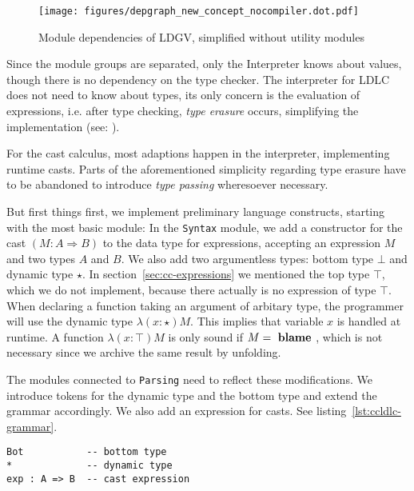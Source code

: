 \begin{figure}
 \centering
 \texttt{[image: figures/depgraph\_new\_concept\_nocompiler.dot.pdf]}
 \caption[Module dependencies of LDGV]{Module dependencies of LDGV, simplified without utility modules}
 \label{fig:dependency-graph}
\end{figure}

Since the module groups are separated, only the Interpreter knows about values, though there is no dependency on the type checker. The interpreter for LDLC does not need to know about types, its only concern is the evaluation of expressions, i.e. after type checking, \emph{type erasure} occurs, simplifying the implementation (see: \cite{crary2002}).

For the cast calculus, most adaptions happen in the interpreter, implementing runtime casts. Parts of the aforementioned simplicity regarding type erasure have to be abandoned to introduce \emph{type passing} wheresoever necessary.

But first things first, we implement preliminary language constructs, starting with the most basic module: In the \texttt{Syntax} module, we add a constructor for the cast $(M : A \Rightarrow B)$ to the data type for expressions, accepting an expression $M$ and two types $A$ and $B$. We also add two argumentless types: bottom type $\bot$ and dynamic type $\star$. In section~\ref{sec:cc-expressions} we mentioned the top type $\top$, which we do not implement, because there actually is no expression of type $\top$. When declaring a function taking an argument of arbitary type, the programmer will use the dynamic type $\lambda(x:\star)M$. This implies that variable $x$ is handled at runtime. A function $\lambda(x:\top)M$ is only sound if $M = \text{ \textbf{blame} }$, which is not necessary since we archive the same result by unfolding.

The modules connected to \texttt{Parsing} need to reflect these modifications. We introduce tokens for the dynamic type and the bottom type and extend the grammar accordingly. We also add an expression for casts. See listing~\ref{lst:ccldlc-grammar}.

\begin{lstlisting}[float,language=ldgv,
  caption=LDGV: New language constructs for CCLDLC,
  label=lst:ccldlc-grammar]
Bot           -- bottom type
*             -- dynamic type
exp : A => B  -- cast expression
\end{lstlisting}

